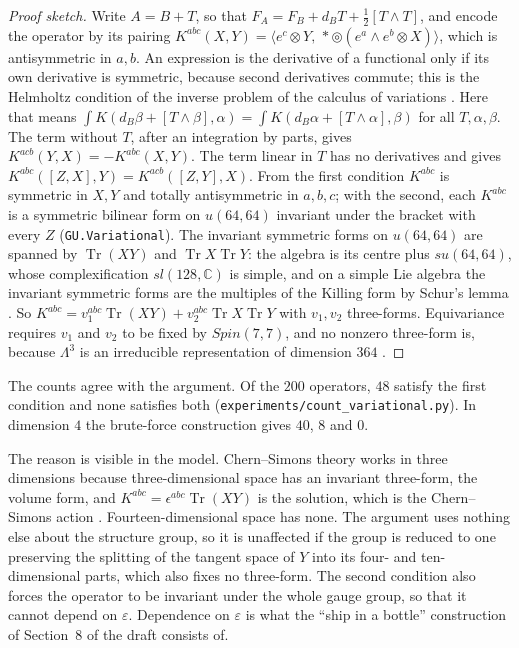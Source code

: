 \documentclass[11pt]{article}
\theoremstyle{remark}
\newcommand{\eps}{\varepsilon}
\newcommand{\Sh}{\circledcirc}
\newcommand{\lean}[1]{\texttt{#1}}
\begin{document}
\begin{proof}[Proof sketch]
Write $A=B+T$, so that $F_A=F_B+d_BT+\tfrac12[T\wedge T]$, and encode the operator by its
pairing $K^{abc}(X,Y)=\langle e^c\otimes Y,\,*\Sh(e^a\wedge e^b\otimes X)\rangle$, which is
antisymmetric in $a,b$. An expression is the derivative of a functional only if its own
derivative is symmetric, because second derivatives commute; this is the Helmholtz condition of
the inverse problem of the calculus of variations \cite[Section~5.4]{Olver}. Here that means
$\int K(d_B\beta+[T\wedge\beta],\alpha)=\int K(d_B\alpha+[T\wedge\alpha],\beta)$ for all
$T,\alpha,\beta$. The term without $T$, after an integration by parts, gives
$K^{acb}(Y,X)=-K^{abc}(X,Y)$. The term linear in $T$ has no derivatives and gives
$K^{abc}([Z,X],Y)=K^{acb}([Z,Y],X)$. From the first condition $K^{abc}$ is symmetric in $X,Y$
and totally antisymmetric in $a,b,c$; with the second, each $K^{abc}$ is a symmetric bilinear
form on $u(64,64)$ invariant under the bracket with every $Z$ (\lean{GU.Variational}). The
invariant symmetric forms on $u(64,64)$ are spanned by $\operatorname{Tr}(XY)$ and
$\operatorname{Tr}X\operatorname{Tr}Y$: the algebra is its centre plus $su(64,64)$, whose
complexification $sl(128,\mathbb C)$ is simple, and on a simple Lie algebra the invariant
symmetric forms are the multiples of the Killing form by Schur's lemma
\cite[Section~6]{Humphreys}. So $K^{abc}=v_1^{abc}\operatorname{Tr}(XY)
+v_2^{abc}\operatorname{Tr}X\operatorname{Tr}Y$ with $v_1,v_2$ three-forms. Equivariance
requires $v_1$ and $v_2$ to be fixed by $Spin(7,7)$, and no nonzero three-form is, because
$\Lambda^3$ is an irreducible representation of dimension $364$ \cite[Section~19.2]{FH}.
\end{proof}

The counts agree with the argument. Of the $200$ operators, $48$ satisfy the first condition
and none satisfies both (\lean{experiments/count\_variational.py}). In dimension $4$ the
brute-force construction gives $40$, $8$ and $0$.

The reason is visible in the model. Chern--Simons theory works in three dimensions because
three-dimensional space has an invariant three-form, the volume form, and
$K^{abc}=\epsilon^{abc}\operatorname{Tr}(XY)$ is the solution, which is the Chern--Simons
action \cite{CS,Witten}. Fourteen-dimensional space has
none. The argument uses nothing else about the structure group, so it is unaffected if the
group is reduced to one preserving the splitting of the tangent space of $Y$ into its
four- and ten-dimensional parts, which also fixes no three-form. The second condition also
forces the operator to be invariant under the whole gauge group, so that it cannot depend on
$\eps$. Dependence on $\eps$ is what the ``ship in a bottle'' construction of Section~8 of the
draft consists of.
\end{document}
